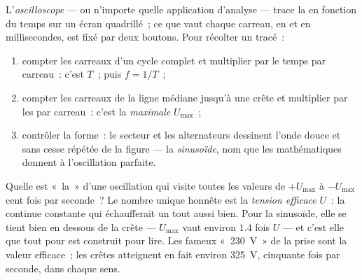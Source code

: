 \begin{method}\label{met:g9:alternating-current:scope}
L'\emph{oscilloscope} --- ou n'importe quelle
application d'analyse --- trace la  en fonction du temps sur un
écran quadrillé~; ce que vaut chaque carreau, en  et en
millisecondes, est fixé par deux boutons. Pour récolter un tracé~:
\begin{enumerate}
  \item compter les carreaux d'un cycle complet et multiplier par
        le temps par carreau~: c'est $T$~; puis $f = 1/T$~;
  \item compter les carreaux de la ligne médiane jusqu'à une crête
        et multiplier par les  par carreau~: c'est la
        \emph{ maximale} $U_{\text{max}}$~;
  \item contrôler la forme~: le secteur et les alternateurs
        dessinent l'onde douce et sans cesse répétée de la figure
        --- la \emph{sinusoïde}, nom que les mathématiques donnent à
        l'oscillation parfaite.
\end{enumerate}
\end{method}

\begin{proposition}\label{prop:g9:alternating-current:effective}
Quelle est «~la~»  d'une oscillation qui visite toutes les
valeurs de $+U_{\text{max}}$ à $-U_{\text{max}}$ cent fois par
seconde~? Le nombre unique honnête est la \emph{tension
efficace} $U$~: la  continue constante
qui échaufferait un  tout aussi bien. Pour la sinusoïde, elle
se tient bien en dessous de la crête --- $U_{\text{max}}$ vaut
environ $1.4$ fois $U$ --- et c'est elle que tout  pour
 est construit pour lire. Les fameux
«~\qty{230}{V}~» de la prise sont la valeur efficace~; les crêtes
atteignent en fait environ \qty{325}{V}, cinquante fois par seconde,
dans chaque sens.
\end{proposition}

